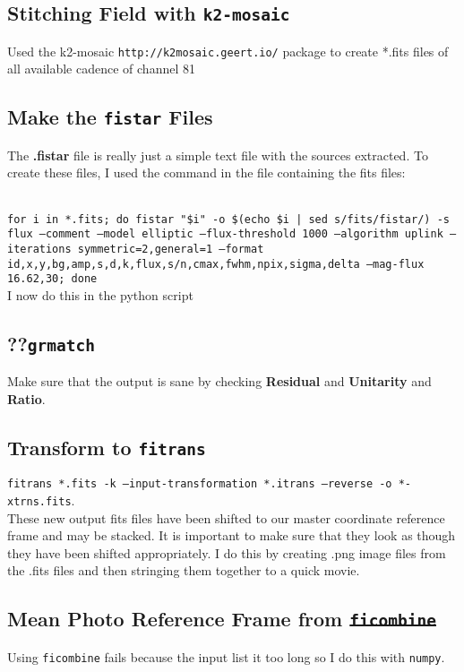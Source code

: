 \subsection*{Stitching Field with \texttt{k2-mosaic}}
Used the k2-mosaic \texttt{http://k2mosaic.geert.io/} package to create *.fits files of all available cadence of channel 81

\subsection*{Make the \texttt{fistar} Files}
The \textbf{.fistar} file is really just a simple text file with the sources extracted. 
To create these files, I used the  command in the file containing the fits files:

\\\texttt{for i in *.fits; do fistar "\$i" -o \$(echo \$i | sed s/fits/fistar/)  -s flux --comment 
--model elliptic --flux-threshold 1000 --algorithm uplink --iterations symmetric=2,general=1 
--format id,x,y,bg,amp,s,d,k,flux,s/n,cmax,fwhm,npix,sigma,delta 
--mag-flux 16.62,30; done}\\
I now do this in the python script

\subsection*{??\texttt{grmatch}}
Make sure that the output is sane by checking  \textbf{Residual} and \textbf{Unitarity} and \textbf{Ratio}.

\subsection*{Transform to \texttt{fitrans}}
\texttt{fitrans *.fits -k --input-transformation *.itrans --reverse -o *-xtrns.fits}.\\ 
These new output fits files have been shifted to our master coordinate reference frame and may be stacked. It is important to make sure that they look as though they have been shifted appropriately. I do this by creating .png image files from the .fits files and then stringing them together to a quick movie.

\subsection*{Mean Photo Reference Frame from \sout{\texttt{ficombine}}}
Using \texttt{ficombine} fails because the input list it too long so I do this with \texttt{numpy}.

